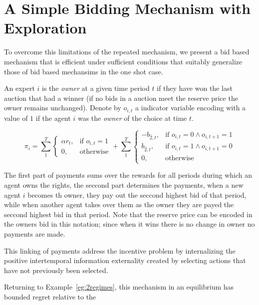\section{A Simple Bidding Mechanism with Exploration}

To overcome this limitations of the repeated mechanism, we present a bid based mechanism that is efficient under sufficient conditions that suitably generalize those of bid based mechansims in the one shot case. 

\begin{mech}

An expert $i$ is the \emph{owner} at a given time period $t$ if they have won the last auction that had a winner (if no bids in a auction meet the reserve price the owner remains unchanged). 
Denote by $o_{i,t}$ a indicator variable encoding with a value of $1$ if the agent $i$ was the \emph{owner} of the choice at time $t$. 

\[
    \pi_i =  \sum_1^T
\begin{cases}
    \alpha r_t ,& \text{if } o_{i,t} = 1\\
    0,              & \text{otherwise}
\end{cases}
+
\sum_1^T
\begin{cases}
     - b_{\hat{2},t} ,& \text{if } o_{i,t} = 0 \land o_{i,t+1} = 1\\
      b_{\hat{2},t} ,& \text{if } o_{i,t}= 1 \land o_{i,t+1} = 0 \\
		0,              & \text{otherwise}
\end{cases}
\]

\end{mech}


The first part of payments sums over the rewards for all periods during which an agent owns the rights, the seccond part determines the payments, when a new agent $i$ becomes th owner, they pay out the seccond highest bid of that period, while when another agent takes over them as the owner they are payed the seccond highest bid in that period. Note that the reserve price can be encoded in the owners bid in this notation; since when it wins there is no change in owner no payments are made. 

This linking of payments address the incentive problem by internalizing the positive intertemporal information externality created by selecting actions that have not previously been selected.


Returning to Example~\ref{eg:2regimes}, this mechanism in an equilibrium has bounded regret relative to the 

